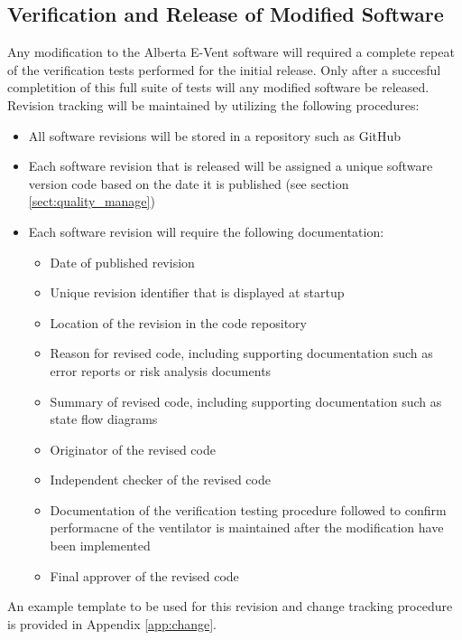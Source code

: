 \documentclass[]{article}
\begin{document}
\subsection{Verification and Release of Modified Software}
\label{sect:mod_tests}
Any modification to the Alberta E-Vent software will required a complete repeat of the verification tests performed for the initial release.  Only after a succesful completition of this full suite of tests will any modified software be released.  Revision tracking will be maintained by utilizing the following procedures:
\begin{itemize}
	\item All software revisions will be stored in a repository such as GitHub
	\item Each software revision that is released will be assigned a unique software version code based on the date it is published (see section \ref{sect:quality_manage})
	\item Each software revision will require the following documentation:
	\begin{itemize}
		\item Date of published revision
		\item Unique revision identifier that is displayed at startup
		\item Location of the revision in the code repository
		\item Reason for revised code, including supporting documentation such as error reports or risk analysis documents
		\item Summary of revised code, including supporting documentation such as state flow diagrams 
		\item Originator of the revised code
		\item Independent checker of the revised code
		\item Documentation of the verification testing procedure followed to confirm performacne of the ventilator is maintained after the modification have been implemented
		\item Final approver of the revised code
	\end{itemize}
\end{itemize}

\noindent An example template to be used for this revision and change tracking procedure is provided in Appendix \ref{app:change}.


\clearpage
\end{document}

